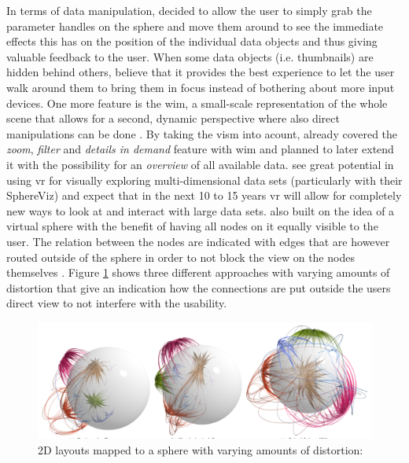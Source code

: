 In terms of data manipulation, \cite{Soldati2007} decided to allow the user to simply grab the parameter handles on the sphere and move them around to see the immediate effects this has on the position of the individual data objects and thus giving valuable feedback to the user. When some data objects (i.e. thumbnails) are hidden behind others, \cite{Soldati2007} believe that it provides the best experience to let the user walk around them to bring them in focus instead of bothering about more input devices. One more feature is the \gls{wim}, a small-scale representation of the whole scene that allows for a second, dynamic perspective where also direct manipulations can be done \citep{Soldati2007}. By taking the \gls{vism} into acount, \cite{Soldati2007} already covered the \textit{zoom}, \textit{filter} and \textit{details in demand} feature with \gls{wim} and planned to later extend it with the possibility for an \textit{overview} of all available data. \cite{Soldati2007} see great potential in using \gls{vr} for visually exploring multi-dimensional data sets (particularly with their SphereViz) and expect that in the next 10 to 15 years \gls{vr} will allow for completely new ways to look at and interact with large data sets. \newline
\cite{Kwon2015} also built on the idea of a virtual sphere with the benefit of having all nodes on it equally visible to the user. The relation between the nodes are indicated with edges that are however routed outside of the sphere in order to not block the view on the nodes themselves \citep{Kwon2015}. Figure \ref{fig:sphericalgraph} shows three different approaches with varying amounts of distortion that give an indication how the connections are put outside the users direct view to not interfere with the usability.
\begin{figure}[t]
	\begin{center}
		\includegraphics[width=14cm]{03_Figures/05_LitReview/Kwon2015_SphericalGraphLayout.png}
		\caption[2D layouts mapped to a sphere with varying amounts of distortion]{2D layouts mapped to a sphere with varying amounts of distortion:  \citep{Kwon2015}}
		\label{fig:sphericalgraph}
	\end{center}
\end{figure}

